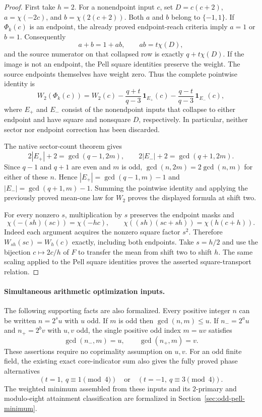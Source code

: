 \documentclass[11pt]{article}
\begin{document}
\begin{proof}
First take \(h=2\). For a nonendpoint input \(c\), set
\(D=c(c+2)\), \(a=\chi(-2c)\), and \(b=\chi(2(c+2))\).
Both \(a\) and \(b\) belong to \(\{-1,1\}\).
If \(\Phi_k(c)\) is an endpoint, the already proved endpoint-reach
criteria imply \(a=1\) or \(b=1\). Consequently
\[
 a+b=1+ab,\qquad ab=t\chi(D),
\]
and the source numerator on that collapsed row is exactly
\(q+t\chi(D)\). If the image is not an endpoint, the Pell square
identities preserve the weight. The source endpoints themselves
have weight zero. Thus the complete pointwise identity is
\[
 W_2(\Phi_k(c))=W_2(c)
 -\frac{q+t}{q-3}\,\mathbf 1_{E_+}(c)
 -\frac{q-t}{q-3}\,\mathbf 1_{E_-}(c),
\]
where \(E_+\) and \(E_-\) consist of the nonendpoint inputs that
collapse to either endpoint and have square and nonsquare \(D\),
respectively. In particular, neither sector nor endpoint correction
has been discarded.

The native sector-count theorem gives
\[
 2|E_+|+2=\gcd(q-1,2m),\qquad
 2|E_-|+2=\gcd(q+1,2m).
\]
Since \(q-1\) and \(q+1\) are even and \(m\) is odd,
\(\gcd(n,2m)=2\gcd(n,m)\) for either of these \(n\).
Hence \(|E_+|=\gcd(q-1,m)-1\) and
\(|E_-|=\gcd(q+1,m)-1\).
Summing the pointwise identity and applying the previously proved
mean-one law for \(W_2\) proves the displayed formula at shift two.

For every nonzero \(s\), multiplication by \(s\) preserves the
endpoint masks and
\[
 \chi(-(sh)(sc))=\chi(-hc),\qquad
 \chi((sh)(sc+sh))=\chi(h(c+h)).
\]
Indeed each argument acquires the nonzero square factor \(s^2\).
Therefore \(W_{sh}(sc)=W_h(c)\) exactly, including both endpoints.
Take \(s=h/2\) and use the bijection \(c\mapsto2c/h\) of \(F\)
to transfer the mean from shift two to shift \(h\).
The same scaling applied to the Pell square identities proves
the asserted square-transport relation.
\end{proof}

\paragraph{Simultaneous arithmetic optimization inputs.}
The following supporting facts are also formalized.
Every positive integer \(n\) can be written \(n=2^s u\) with \(u\)
odd. If \(m\) is odd then \(\gcd(n,m)\le u\).
If \(n_-=2^a u\) and \(n_+=2^b v\) with \(u,v\) odd, the single
positive odd index \(m=uv\) satisfies
\[
 \gcd(n_-,m)=u,\qquad \gcd(n_+,m)=v.
\]
These assertions require no coprimality assumption on \(u,v\).
For an odd finite field, the existing exact core-indicator sum
also gives the fully proved phase alternatives
\[
 (t=1,\ q\equiv1\pmod4)
 \quad\text{or}\quad
 (t=-1,\ q\equiv3\pmod4).
\]
The weighted minimum assembled from these inputs and its
\(2\)-primary and modulo-eight attainment classification are
formalized in Section~\ref{sec:odd-pell-minimum}.
\end{document}
